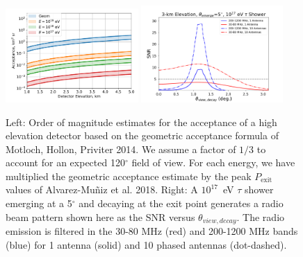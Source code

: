 \documentclass[12pt]{article}
\begin{document}
\begin{figure}[!h]
{\includegraphics[width=0.45\textwidth]{figures/Crude_Estimate.pdf}}
{\includegraphics[width=0.48\textwidth]{figures/SNR_example_emerge5deg_10antenna.pdf}}
\caption{Left: Order of magnitude estimates for the acceptance of a high elevation detector based on the geometric acceptance formula of Motloch, Hollon, Priviter 2014. We assume a factor of $1/3$ to account for an expected 120$^\circ$ field of view. For each energy, we have multiplied the geometric acceptance estimate by the peak $P_\mathrm{exit}$ values of Alvarez-Mu\~niz et al. 2018. Right: A $10^{17}$~eV $\tau$ shower emerging at a 5$^{\circ}$ and decaying at the exit point generates a radio beam pattern shown here as the SNR versus $\theta_{view,decay}$.  The radio emission is filtered in the 30-80 MHz (red) and 200-1200 MHz bands (blue) for 1 antenna (solid) and 10 phased antennas (dot-dashed).   }
\label{fig:crude_estimate}
\end{figure}
\end{document}
